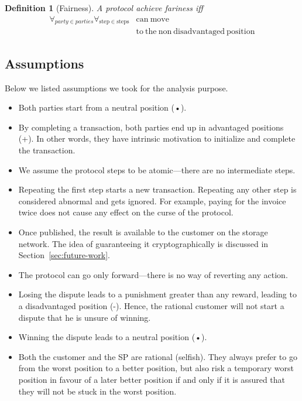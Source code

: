 \documentclass{ieeeaccess}
\newtheorem{definition}{Definition}
\begin{document}
\begin{definition}[Fairness] \label{fairness}
A protocol achieve fariness iff 
\begin{equation*}
\begin{split}
\forall_{party \in parties}\forall_{\mathrm{step} \in \mathrm{steps}} &\mathrm{can\ move}\\
&\mathrm{to\ the\ non\ disadvantaged\ position} 
\end{split}
\end{equation*}

\end{definition}


\subsection{Assumptions}\label{assumptions}

Below  we listed
assumptions we took
for the analysis purpose.  

\begin{itemize}

\item
  Both parties start from a neutral position (•).
\item
  By completing a transaction, both parties end up in advantaged positions (+). In other words, they have intrinsic motivation to initialize and complete the transaction.
\item
  We assume the protocol steps to be atomic—there are no intermediate steps.
\item
  Repeating the first step starts a new transaction. Repeating any other step is considered abnormal and gets ignored. For example, paying for the invoice twice does not cause any effect on the curse of the protocol.
\item Once published, the result is available to the customer on the storage network. The idea of guaranteeing it cryptographically is discussed in Section~\ref{sec:future-work}.
  
  
\item The protocol can go only forward—there is no way of reverting any action.
\item
  Losing the dispute leads to a punishment greater than any reward, leading to a disadvantaged position (-). Hence, the rational customer will not start a dispute that he is unsure of winning.
\item
  Winning the dispute leads to a neutral position (•).
\item
  Both the customer and the SP are rational (selfish). They always prefer to go from the worst position to a better position, but also risk a temporary worst position in favour of a later better position if and only if it is assured that they will not be stuck in the worst position.
\end{itemize}
\end{document}
